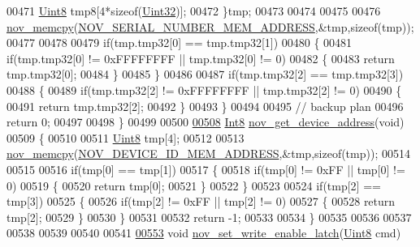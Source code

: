 \begin{DoxyCode}
00471         \hyperlink{a00072_af84840501dec18061d18a68c162a8fa2}{Uint8}  tmp8[4*\textcolor{keyword}{sizeof}(\hyperlink{a00072_aba99025e657f892beb7ff31cecf64653}{Uint32})];
00472     \}tmp;
00473 
00474 
00475 
00476     \hyperlink{a00060_a3ff681f3af83ec441535611dac6ada16}{nov\_memcpy}(\hyperlink{a00029_ab7dc1ea8a7f6e16cf27fbfe88efd7285}{NOV\_SERIAL\_NUMBER\_MEM\_ADDRESS},&tmp,\textcolor{keyword}{sizeof}(tmp));
00477 
00478 
00479     \textcolor{keywordflow}{if}(tmp.tmp32[0] == tmp.tmp32[1])
00480     \{
00481         \textcolor{keywordflow}{if}(tmp.tmp32[0] != 0xFFFFFFFF || tmp.tmp32[0] != 0)
00482         \{
00483             \textcolor{keywordflow}{return}  tmp.tmp32[0];
00484         \}
00485     \}
00486 
00487     \textcolor{keywordflow}{if}(tmp.tmp32[2] == tmp.tmp32[3])
00488     \{
00489         \textcolor{keywordflow}{if}(tmp.tmp32[2] != 0xFFFFFFFF || tmp.tmp32[2] != 0)
00490         \{
00491             \textcolor{keywordflow}{return}  tmp.tmp32[2];
00492         \}
00493     \}
00494 
00495     \textcolor{comment}{// backup plan}
00496     \textcolor{keywordflow}{return} 0;
00497         
00498 \}
00499 
00500 
\hypertarget{a00060_source_l00508}{}\hyperlink{a00060_a1a59d5ac1c5e9a022c19d8c333bf3b60}{00508} \hyperlink{a00072_a7e31ca7716b8d85dd473450a5c5e5a97}{Int8} \hyperlink{a00060_a1a59d5ac1c5e9a022c19d8c333bf3b60}{nov\_get\_device\_address}(\textcolor{keywordtype}{void})
00509 \{
00510 
00511     \hyperlink{a00072_af84840501dec18061d18a68c162a8fa2}{Uint8}  tmp[4];
00512 
00513     \hyperlink{a00060_a3ff681f3af83ec441535611dac6ada16}{nov\_memcpy}(\hyperlink{a00029_a3ddbe5b40319c96bfe46429e902f8d33}{NOV\_DEVICE\_ID\_MEM\_ADDRESS},&tmp,\textcolor{keyword}{sizeof}(tmp));
00514 
00515 
00516     \textcolor{keywordflow}{if}(tmp[0] == tmp[1])
00517     \{
00518         \textcolor{keywordflow}{if}(tmp[0] != 0xFF || tmp[0] != 0)
00519         \{
00520             \textcolor{keywordflow}{return}  tmp[0];
00521         \}
00522     \}
00523 
00524     \textcolor{keywordflow}{if}(tmp[2] == tmp[3])
00525     \{
00526         \textcolor{keywordflow}{if}(tmp[2] != 0xFF || tmp[2] != 0)
00527         \{
00528             \textcolor{keywordflow}{return}  tmp[2];
00529         \}
00530     \}
00531 
00532     \textcolor{keywordflow}{return} -1;
00533 
00534 \}
00535 
00536 
00537 
00538 
00539 
00540 
00541 
\hypertarget{a00060_source_l00553}{}\hyperlink{a00060_a7b698f4b0088c4e28951c2204b7b821e}{00553} \textcolor{keywordtype}{void} \hyperlink{a00060_a7b698f4b0088c4e28951c2204b7b821e}{nov\_set\_write\_enable\_latch}(\hyperlink{a00072_af84840501dec18061d18a68c162a8fa2}{Uint8} cmd)

\end{DoxyCode}
